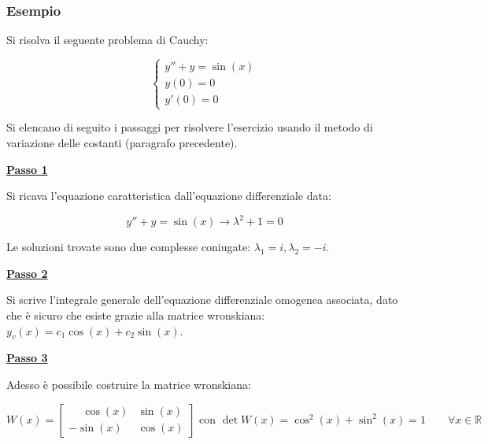 \documentclass[a4paper]{article}
\begin{document}
	\newpage
	
	\subsubsection[Esempio]{\textcolor{Green4}{Esempio}}
	
	Si risolva il seguente problema di Cauchy:
	
	\begin{equation*}
		\begin{cases}
			y'' + y = \sin\left(x\right) \\
			y\left(0\right) = 0 \\
			y'\left(0\right) = 0
		\end{cases}
	\end{equation*}

	\noindent
	Si elencano di seguito i passaggi per risolvere l'esercizio usando il metodo di variazione delle costanti (paragrafo precedente).\newline
	
	\noindent
	\textcolor{Red3}{\textbf{\underline{Passo 1}}}\newline
	
	\noindent
	Si ricava l'equazione caratteristica dall'equazione differenziale data:
	
	\begin{equation*}
		y'' + y = \sin\left(x\right) \longrightarrow \lambda^{2} + 1 = 0
	\end{equation*}

	\noindent
	Le soluzioni trovate sono due complesse coniugate: $\lambda_{1} = i, \lambda_{2} = -i$.\newline
	
	\noindent
	\textcolor{Red3}{\textbf{\underline{Passo 2}}}\newline
	
	\noindent
	Si scrive l'integrale generale dell'equazione differenziale omogenea associata, dato che è sicuro che esiste grazie alla matrice wronskiana: $y_{v}\left(x\right) = c_{1}\cos\left(x\right) + c_{2}\sin\left(x\right)$.\newline
	
	\noindent
	\textcolor{Red3}{\textbf{\underline{Passo 3}}}\newline
	
	\noindent
	Adesso è possibile costruire la matrice wronskiana:
	
	\begin{equation*}
		W\left(x\right) = \begin{bmatrix}
			\phantom{-}\cos\left(x\right)	&	\sin\left(x\right)	\\
			-\sin\left(x\right)				&	\cos\left(x\right)	
		\end{bmatrix}
		\text{ con } \det W\left(x\right) = \cos^{2}\left(x\right) + \sin^{2}\left(x\right) = 1 \hspace{2em} \forall x \in \mathbb{R}
	\end{equation*}
	
\end{document}
